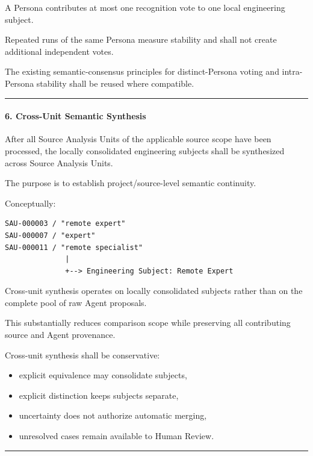 A Persona contributes at most one recognition vote to one local engineering subject.

Repeated runs of the same Persona measure stability and shall not create additional independent votes.

The existing semantic-consensus principles for distinct-Persona voting and intra-Persona stability shall be reused where compatible.

\begin{center}\rule{0.5\linewidth}{0.5pt}\end{center}

\hypertarget{6-cross-unit-semantic-synthesis}{%
\paragraph{6. Cross-Unit Semantic Synthesis}\label{6-cross-unit-semantic-synthesis}}

After all Source Analysis Units of the applicable source scope have been processed, the locally consolidated engineering subjects shall be synthesized across Source Analysis Units.

The purpose is to establish project/source-level semantic continuity.

Conceptually:

\begin{verbatim}
SAU-000003 / "remote expert"
SAU-000007 / "expert"
SAU-000011 / "remote specialist"
              |
              +--> Engineering Subject: Remote Expert
\end{verbatim}

Cross-unit synthesis operates on locally consolidated subjects rather than on the complete pool of raw Agent proposals.

This substantially reduces comparison scope while preserving all contributing source and Agent provenance.

Cross-unit synthesis shall be conservative:

\begin{itemize}
\tightlist
\item
  explicit equivalence may consolidate subjects,
\item
  explicit distinction keeps subjects separate,
\item
  uncertainty does not authorize automatic merging,
\item
  unresolved cases remain available to Human Review.
\end{itemize}

\begin{center}\rule{0.5\linewidth}{0.5pt}\end{center}


